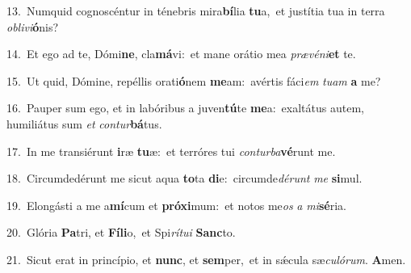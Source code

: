 {\numbfont\textcolor{\numbcolor}{13.}}~Numquid cognoscéntur in ténebris mira\-\textbf{bí}\-lia \textbf{tu}\-a,~\star et justítia tua in terra \textit{ob}\-\textit{li}\textit{vi}\textbf{ó}nis?\par
{\numbfont\textcolor{\numbcolor}{14.}}~Et ego ad te, Dómi\-\textbf{ne}\-, cla\-\textbf{má}\-vi:~\star et mane orátio mea \textit{præ}\-\textit{vé}\textit{ni}\textbf{et} te.\par
{\numbfont\textcolor{\numbcolor}{15.}}~Ut quid, Dómine, repéllis orati\-\textbf{ó}\-nem \textbf{me}\-am:~\star avértis fáci\textit{em} \textit{tu}\-\textit{am} \textbf{a} me?\par
{\numbfont\textcolor{\numbcolor}{16.}}~Pauper sum ego, et in labóribus a juven\-\textbf{tú}\-te \textbf{me}\-a:~\star exaltátus autem, humiliátus sum \textit{et} \textit{con}\-\textit{tur}\textbf{bá}tus.\par
{\numbfont\textcolor{\numbcolor}{17.}}~In me transiérunt \textbf{i}\-ræ \textbf{tu}\-æ:~\star et terróres tui \textit{con}\-\textit{tur}\textit{ba}\textbf{vé}runt me.\par
{\numbfont\textcolor{\numbcolor}{18.}}~Circumdedérunt me sicut aqua \textbf{to}\-ta \textbf{di}\-e:~\star circumde\-\textit{dé}\-\textit{runt} \textit{me} \textbf{si}\-mul.\par
{\numbfont\textcolor{\numbcolor}{19.}}~Elongásti a me a\-\textbf{mí}\-cum et \textbf{pró}\-\textbf{xi}mum:~\star et notos me\textit{os} \textit{a} \textit{mi}\-\textbf{sé}ria.\par
{\numbfont\textcolor{\numbcolor}{20.}}~Glória \textbf{Pa}\-tri, et \textbf{Fí}\-\textbf{li}o,~\star et Spi\-\textit{rí}\-\textit{tu}\textit{i} \textbf{Sanc}\-to.\par
{\numbfont\textcolor{\numbcolor}{21.}}~Sicut erat in princípio, et \textbf{nunc}\-, et \textbf{sem}\-per,~\star et in sǽcula sæ\-\textit{cu}\-\textit{ló}\textit{rum}. \textbf{A}\-men.\par

